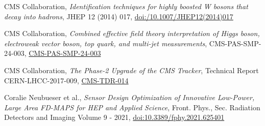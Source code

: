 {\begin{thebibliography}{9}
\bibitem{[4]}
CMS Collaboration, {\em Identification techniques for highly boosted W bosons that decay into hadrons}, JHEP 12 (2014) 017, \href{https://link.springer.com/article/10.1007/JHEP12(2014)017}{doi:/10.1007/JHEP12(2014)017}

\bibitem{[5]}
CMS Collaboration, {\em Combined effective field theory interpretation of Higgs boson, electroweak vector boson, top quark, and multi-jet measurements}, CMS-PAS-SMP-24-003, \href{https://cds.cern.ch/record/2911229/}{CMS-PAS-SMP-24-003}

\bibitem{[6]}
CMS Collaboration, {\em The Phase-2 Upgrade of the CMS Tracker}, Technical Report CERN-LHCC-2017-009, \href{https://cds.cern.ch/record/2272264?ln=en}{CMS-TDR-014}

\bibitem{[7]}
Coralie Neubueser et al., {\em Sensor Design Optimization of Innovative Low-Power, Large Area FD-MAPS for HEP and Applied Science}, Front. Phys., Sec. Radiation Detectors and Imaging
Volume 9 - 2021, \href{https://doi.org/10.3389/fphy.2021.625401}{doi:10.3389/fphy.2021.625401}
\end{thebibliography}
}
